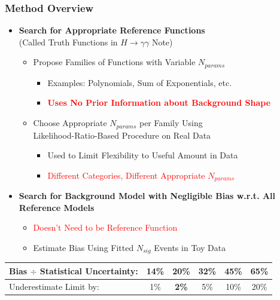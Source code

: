 \documentclass{beamer}
\newcommand{\tredbf}[1]{\textcolor{red}{\bf #1}}
\begin{document}
\begin{frame}
\frametitle{Method Overview}
  \begin{itemize}
    \item {\bf Search for Appropriate Reference Functions} \\ (Called Truth Functions in $H\rightarrow\gamma\gamma$ Note)
      \begin{itemize}
        \item Propose Families of Functions with Variable $N_{params}$
          \begin{itemize}
              \item Examples: Polynomials, Sum of Exponentials, etc.
              \item \tredbf{Uses No Prior Information about Background Shape}
          \end{itemize}
        \item Choose Appropriate $N_{params}$ per Family Using \\ 
                  Likelihood-Ratio-Based Procedure on Real Data
          \begin{itemize}
              \item Used to Limit Flexibility to Useful Amount in Data
              \item \textcolor{red}{ Different Categories, Different Appropriate $N_{params}$}
          \end{itemize}
      \end{itemize}
    \item {\bf Search for Background Model with Negligible Bias w.r.t. All Reference Models}
    \begin{itemize}
      \item \textcolor{red}{Doesn't Need to be Reference Function}
      \item Estimate Bias Using Fitted $N_{sig}$ Events in Toy Data
    \end{itemize}
  \end{itemize}
\begin{center}
  \small
  \begin{tabular}{|l|c|c|c|c|c|} \hline
    Bias $\div$ Statistical Uncertainty: & 14\% & \textbf{20\%} & 32\% & 45\% & 65\% \\ \hline
    Underestimate Limit by: & 1\% & \textbf{2\%} & 5\% & 10\% & 20\% \\ \hline
  \end{tabular}
\end{center}
\end{frame}
\end{document}
